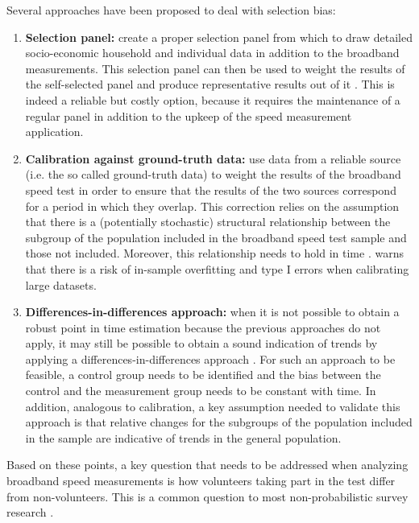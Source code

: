 \documentclass[12pt]{article}
\begin{document}
Several approaches have been proposed to deal with selection bias:

\begin{enumerate}

	\item \textbf{Selection panel:} create a proper selection panel from which to draw detailed socio-economic household and individual data in addition to the broadband measurements. This selection panel can then be used to weight the results of the self-selected panel and produce representative results out of it \citep{opt2012}. This is indeed a reliable but costly option, because it requires the maintenance of a regular panel in addition to the upkeep of the speed measurement application.
	
	\item \textbf{Calibration against ground-truth data:} use data from a reliable source (i.e. the so called ground-truth data) to weight the results of the broadband speed test in order to ensure that the results of the two sources correspond for a period in which they overlap.  This correction relies on the assumption that there is a (potentially stochastic) structural relationship between the subgroup of the population included in the broadband speed test sample and those not included. Moreover, this relationship needs to hold in time \citep{zagheni2015}. \cite{couper2013} warns that there is a risk of in-sample overfitting and type I errors when calibrating large datasets.
	
	\item \textbf{Differences-in-differences approach:} when it is not possible to obtain a robust point in time estimation because the previous approaches do not apply, it may still be possible to obtain a sound indication of trends by applying a differences-in-differences approach \citep{zagheni2015}. For such an approach to be feasible, a control group needs to be identified and the bias between the control and the measurement group needs to be constant with time. In addition, analogous to calibration, a key assumption needed to validate this approach is that relative changes for the subgroups of the population included in the sample are indicative of trends in the general population.         

\end{enumerate}  

Based on these points, a key question that needs to be addressed when analyzing broadband speed measurements is how volunteers taking part in the test differ from non-volunteers. This is a common question to most non-probabilistic survey research \citep{couper2013}. 
\end{document}
